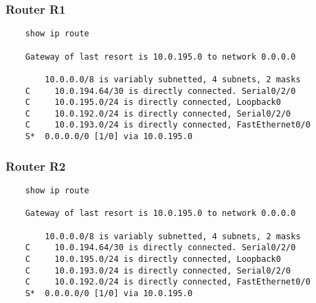 \documentclass[wide,a4paper,titlepage,12pt] {article}
\begin{document}
  \subsubsection{Router R1}
  \begin{verbatim}
    show ip route

    Gateway of last resort is 10.0.195.0 to network 0.0.0.0

        10.0.0.0/8 is variably subnetted, 4 subnets, 2 masks
    C     10.0.194.64/30 is directly connected. Serial0/2/0
    C     10.0.195.0/24 is directly connected, Loopback0
    C     10.0.192.0/24 is directly connected, Serial0/2/0
    C     10.0.193.0/24 is directly connected, FastEthernet0/0
    S*  0.0.0.0/0 [1/0] via 10.0.195.0
  \end{verbatim}

  \subsubsection{Router R2}
  \begin{verbatim}
    show ip route

    Gateway of last resort is 10.0.195.0 to network 0.0.0.0

        10.0.0.0/8 is variably subnetted, 4 subnets, 2 masks
    C     10.0.194.64/30 is directly connected. Serial0/2/0
    C     10.0.195.0/24 is directly connected, Loopback0
    C     10.0.193.0/24 is directly connected, Serial0/2/0
    C     10.0.192.0/24 is directly connected, FastEthernet0/0
    S*  0.0.0.0/0 [1/0] via 10.0.195.0
  \end{verbatim}
\end{document}
